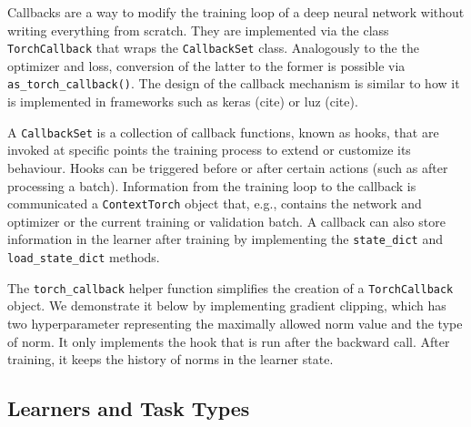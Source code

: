 \documentclass[article, nojss]{jss}
\theoremstyle{definition}
\begin{document}
Callbacks are a way to modify the training loop of a deep neural network without writing everything from scratch.
They are implemented via the  class \texttt{TorchCallback} that wraps the \texttt{CallbackSet} class.
Analogously to the the optimizer and loss, conversion of the latter to the former is possible via \texttt{as\_torch\_callback()}.
The design of the callback mechanism is similar to how it is implemented in frameworks such as keras (cite) or luz (cite).

A \texttt{CallbackSet} is a collection of callback functions, known as hooks, that are invoked at specific points the training process to extend or customize its behaviour.
Hooks can be triggered before or after certain actions (such as after processing a batch).
Information from the training loop to the callback is communicated a \texttt{ContextTorch} object that, e.g., contains the network and optimizer or the current training or validation batch.
A callback can also store information in the learner after training by implementing the \texttt{state\_dict} and \texttt{load\_state\_dict} methods.

The \texttt{torch\_callback} helper function simplifies the creation of a \texttt{TorchCallback} object.
We demonstrate it below by implementing gradient clipping, which has two hyperparameter representing the maximally allowed norm value and the type of norm.
It only implements the hook that is run after the backward call.
After training, it keeps the history of norms in the learner state.


\subsection{Learners and Task Types}\label{sec:extending-learner-task}
\end{document}
